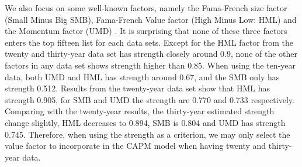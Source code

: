

We also focus on some well-known factors, namely the Fama-French size factor (Small Minus Big SMB), Fama-French Value factor (High Minus Low: HML) \cite{Fama1992} and the Momentum factor (UMD) \cite{Carhart1997}.
It is surprising that none of these three factors enters the top fifteen list for each data sets.
Except for the HML factor from the twenty and thirty-year data set has strength closely around 0.9, none of the other factors in any data set shows strength higher than 0.85.
When using the ten-year data, both UMD and HML has strength around 0.67, and the SMB only has strength 0.512.
Results from the twenty-year data set show that HML has strength 0.905, for SMB and UMD the strength are 0.770 and 0.733 respectively.
Comparing with the twenty-year results, the thirty-year estimated strength change slightly, HML decreases to 0.894, SMB is 0.804 and UMD has strength 0.745.
Therefore, when using the strength as a criterion, we may only select the value factor to incorporate in the CAPM model when having twenty and thirty-year data.

